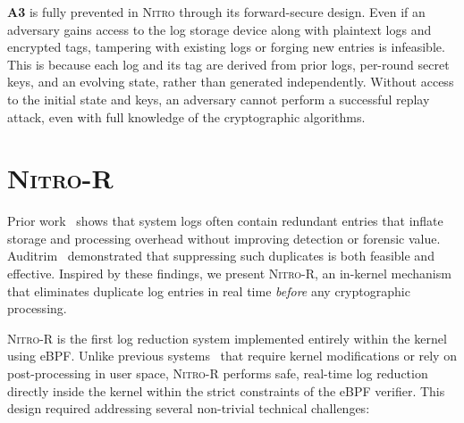 \documentclass[sigconf]{sty/acmart}
\newcommand{\Sys}{\mbox{\textsc{Nitro}}\xspace}
\newcommand{\SysR}{\mbox{\textsc{Nitro-R}}\xspace}
\begin{document}
{\bf A3} is fully prevented in \Sys through its forward-secure design. Even if an adversary gains access to the log storage device along with plaintext logs and encrypted tags, tampering with existing logs or forging new entries is infeasible. This is because each log and its tag are derived from prior logs, per-round secret keys, and an evolving state, rather than generated independently. Without access to the initial state and keys, an adversary cannot perform a successful replay attack, even with full knowledge of the cryptographic algorithms.
 \section{\SysR}
\label{s:reduction}

Prior work~\cite{inam2022sok,priotracker2018,hossain+depend,auditrim,swift2020,loggc,elise} shows that system logs often contain redundant entries that inflate storage and processing overhead without improving detection or forensic value. Auditrim~\cite{auditrim} demonstrated that suppressing such duplicates is both feasible and effective. Inspired by these findings, we present \SysR, an in-kernel mechanism that eliminates duplicate log entries in real time \textit{before} any cryptographic processing.

\SysR is the first log reduction system implemented entirely within the kernel using eBPF. Unlike previous systems~\cite{kcal,tang2018nodemerge,loggc,inam2022sok,hossain+depend} that require kernel modifications or rely on post-processing in user space, \SysR performs safe, real-time log reduction directly inside the kernel within the strict constraints of the eBPF verifier. This design required addressing several non-trivial technical challenges:
\end{document}
